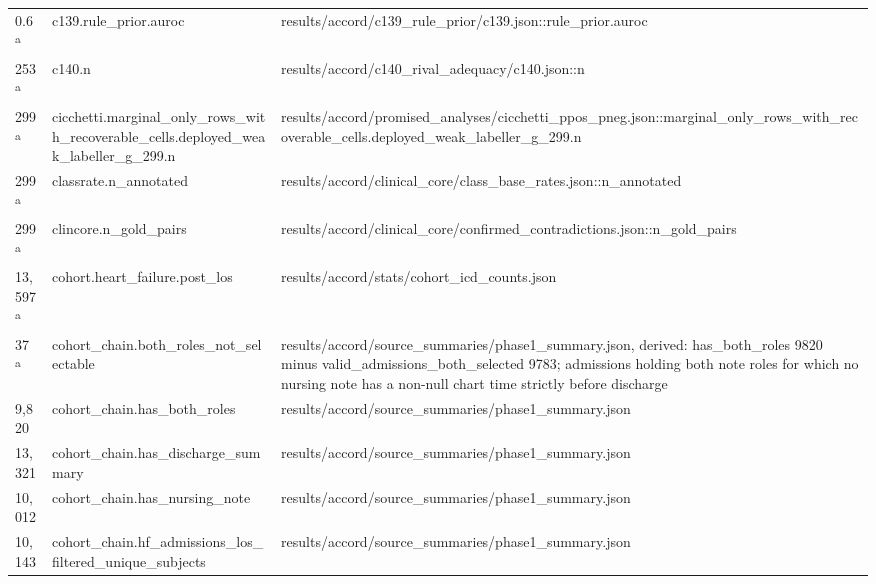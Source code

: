 \begin{longtable}{@{}p{0.7in}p{1.9in}p{2.6in}@{}}
0.6 \textsuperscript{a} & c139.\allowbreak{}rule\_prior.\allowbreak{}auroc & results/\allowbreak{}accord/\allowbreak{}c139\_rule\_prior/\allowbreak{}c139.\allowbreak{}json::rule\_prior.\allowbreak{}auroc\\
253 \textsuperscript{a} & c140.\allowbreak{}n & results/\allowbreak{}accord/\allowbreak{}c140\_rival\_adequacy/\allowbreak{}c140.\allowbreak{}json::n\\
299 \textsuperscript{a} & cicchetti.\allowbreak{}marginal\_only\_rows\_with\_recoverable\_cells.\allowbreak{}deployed\_weak\_labeller\_g\_299.\allowbreak{}n & results/\allowbreak{}accord/\allowbreak{}promised\_analyses/\allowbreak{}cicchetti\_ppos\_pneg.\allowbreak{}json::marginal\_only\_rows\_with\_recoverable\_cells.\allowbreak{}deployed\_weak\_labeller\_g\_299.\allowbreak{}n\\
299 \textsuperscript{a} & classrate.\allowbreak{}n\_annotated & results/\allowbreak{}accord/\allowbreak{}clinical\_core/\allowbreak{}class\_base\_rates.\allowbreak{}json::n\_annotated\\
299 \textsuperscript{a} & clincore.\allowbreak{}n\_gold\_pairs & results/\allowbreak{}accord/\allowbreak{}clinical\_core/\allowbreak{}confirmed\_contradictions.\allowbreak{}json::n\_gold\_pairs\\
13,597 \textsuperscript{a} & cohort.\allowbreak{}heart\_failure.\allowbreak{}post\_los & results/\allowbreak{}accord/\allowbreak{}stats/\allowbreak{}cohort\_icd\_counts.\allowbreak{}json\\
37 \textsuperscript{a} & cohort\_chain.\allowbreak{}both\_roles\_not\_selectable & results/\allowbreak{}accord/\allowbreak{}source\_summaries/\allowbreak{}phase1\_summary.\allowbreak{}json, derived: has\_both\_roles 9820 minus valid\_admissions\_both\_selected 9783; admissions holding both note roles for which no nursing note has a non-null chart time strictly before discharge\\
9,820 & cohort\_chain.\allowbreak{}has\_both\_roles & results/\allowbreak{}accord/\allowbreak{}source\_summaries/\allowbreak{}phase1\_summary.\allowbreak{}json\\
13,321 & cohort\_chain.\allowbreak{}has\_discharge\_summary & results/\allowbreak{}accord/\allowbreak{}source\_summaries/\allowbreak{}phase1\_summary.\allowbreak{}json\\
10,012 & cohort\_chain.\allowbreak{}has\_nursing\_note & results/\allowbreak{}accord/\allowbreak{}source\_summaries/\allowbreak{}phase1\_summary.\allowbreak{}json\\
10,143 & cohort\_chain.\allowbreak{}hf\_admissions\_los\_filtered\_unique\_subjects & results/\allowbreak{}accord/\allowbreak{}source\_summaries/\allowbreak{}phase1\_summary.\allowbreak{}json\\

\end{longtable}
